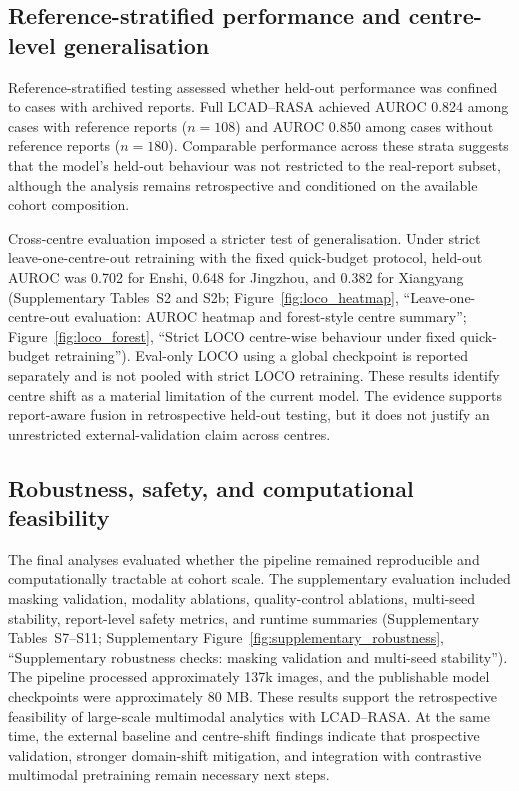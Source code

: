 \subsection{Reference-stratified performance and centre-level generalisation}
\label{subsec:loco_results}

Reference-stratified testing assessed whether held-out performance was confined to cases with archived reports. Full LCAD--RASA achieved AUROC 0.824 among cases with reference reports ($n=108$) and AUROC 0.850 among cases without reference reports ($n=180$). Comparable performance across these strata suggests that the model's held-out behaviour was not restricted to the real-report subset, although the analysis remains retrospective and conditioned on the available cohort composition.

Cross-centre evaluation imposed a stricter test of generalisation. Under strict leave-one-centre-out retraining with the fixed quick-budget protocol, held-out AUROC was 0.702 for Enshi, 0.648 for Jingzhou, and 0.382 for Xiangyang (Supplementary Tables~S2 and S2b; Figure~\ref{fig:loco_heatmap}, ``Leave-one-centre-out evaluation: AUROC heatmap and forest-style centre summary''; Figure~\ref{fig:loco_forest}, ``Strict LOCO centre-wise behaviour under fixed quick-budget retraining''). Eval-only LOCO using a global checkpoint is reported separately and is not pooled with strict LOCO retraining. These results identify centre shift as a material limitation of the current model. The evidence supports report-aware fusion in retrospective held-out testing, but it does not justify an unrestricted external-validation claim across centres.

\subsection{Robustness, safety, and computational feasibility}
\label{subsec:robustness_safety_scalability}

The final analyses evaluated whether the pipeline remained reproducible and computationally tractable at cohort scale. The supplementary evaluation included masking validation, modality ablations, quality-control ablations, multi-seed stability, report-level safety metrics, and runtime summaries (Supplementary Tables~S7--S11; Supplementary Figure~\ref{fig:supplementary_robustness}, ``Supplementary robustness checks: masking validation and multi-seed stability''). The pipeline processed approximately 137k images, and the publishable model checkpoints were approximately 80 MB. These results support the retrospective feasibility of large-scale multimodal analytics with LCAD--RASA. At the same time, the external baseline and centre-shift findings indicate that prospective validation, stronger domain-shift mitigation, and integration with contrastive multimodal pretraining remain necessary next steps.
